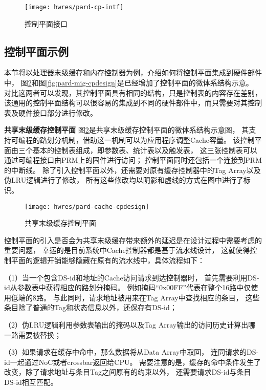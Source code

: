 \begin{figure}[tb]
  \centering
  \texttt{[image: hwres/pard-cp-intf]}
  \caption[控制平面接口]{控制平面接口}
  \label{fig:pard-cp-intf}
\end{figure}


\subsection{控制平面示例}

本节将以处理器末级缓存和内存控制器为例，介绍如何将控制平面集成到硬件部件中，
图\ref{fig:pard-cache-cpdesign}和图\ref{fig:pard-mig-cpdesign}是已经增加了控制平面的微体系结构示意。
对比这两者可以发现，其控制平面具有相同的结构，只是控制表的内容存在差别，
该通用的控制平面结构可以很容易的集成到不同的硬件部件中，而只需要对其控制表及硬件接口部分进行修改。

\textbf{共享末级缓存控制平面}\quad
图\ref{fig:pard-cache-cpdesign}是共享末级缓存控制平面的微体系结构示意图，
其支持可编程的路划分机制，借助这一机制可以为应用程序调整Cache容量。
该控制平面由三个基本的控制表组成，即参数表、统计表以及触发表，
这三张控制表可以通过可编程接口由PRM上的固件进行访问；
控制平面同时还包括一个连接到PRM的中断线。
除了引入控制平面以外，还需要对原有缓存控制器中的Tag Array以及伪LRU逻辑进行了修改，
所有这些修改均以阴影和虚线的方式在图中进行了标识。

\begin{figure}[tb]
  \centering
  \texttt{[image: hwres/pard-cache-cpdesign]}
  \caption{共享末级缓存控制平面}
  \label{fig:pard-cache-cpdesign}
\end{figure}

控制平面的引入是否会为共享末级缓存带来额外的延迟是在设计过程中需要考虑的重要问题，
幸运的是目前系统中Cache控制器都是基于流水线设计，
这就使得控制平面的逻辑开销能够隐藏在原有的流水线中，具体流程如下：

（1）当一个包含DS-id和地址的Cache访问请求到达控制器时，
首先需要利用DS-id从参数表中获得相应的路划分掩码。
例如掩码``0x00FF''代表在整个16路中仅使用低端的8路。
与此同时，请求地址被用来在Tag Array中查找相应的条目，
这些条目除了普通的Tag和状态信息以外，还保存有DS-id；

（2）伪LRU逻辑利用参数表输出的掩码以及Tag Array输出的访问历史计算出哪一路需要被替换；

（3）如果请求在缓存中命中，那么数据将从Data Array中取回，
连同请求的DS-id一起通过NoC或者crossbar返回给CPU。
需要注意的是，缓存的命中条件发生了改变，除了请求地址与条目Tag之间原有的约束以外，
还需要请求DS-id与条目DS-id相互匹配。

